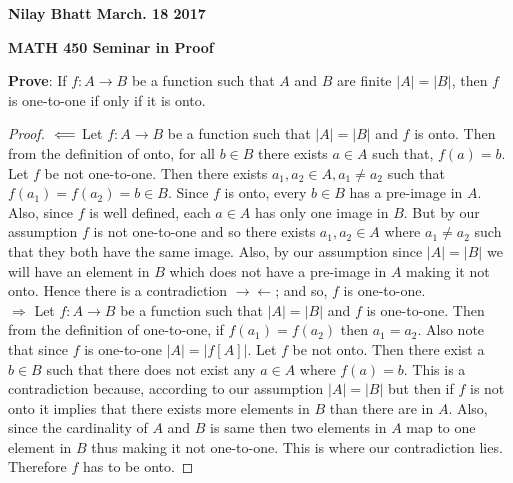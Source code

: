 \documentclass[12pt, fullpage]{article}
\begin{document}
\begin{flushleft}
\textbf{Nilay Bhatt March. 18 2017}		
\end{flushleft}
\begin{center}		
{\bf MATH 450 Seminar in Proof}
 \\
\end{center}
\textbf{Prove}: If $f: A \rightarrow B$ be a function such that $A$ and $B$ are finite $\vert A \vert = \vert B \vert$, then $f$ is one-to-one if only if it is onto.

\begin{proof}
$\\ \Longleftarrow$ Let $f: A \rightarrow B$ be a function such that $\vert A \vert = \vert B \vert$ and $f$ is onto. Then from the definition of onto, for all  $b \in B$ there exists $ a \in A$ such that, $f(a) = b$. Let $f$ be not one-to-one. Then there exists $a_1,a_2 \in A, a_1 \neq a_2$ such that $f(a_1) = f(a_2) = b \in B$. Since $f$ is onto, every $b \in B$ has a pre-image in $A$. Also, since $f$ is well defined, each $a \in A$ has only one image in $B$. But by our assumption $f$ is not one-to-one and so there exists $a_1, a_2 \in A$ where $a_1 \neq a_2$ such that they both have the same image. Also, by our assumption since $\vert A \vert = \vert B \vert$ we will have an element in $B$ which does not have a pre-image in $A$ making it not onto. Hence there is a contradiction $\rightarrow\leftarrow$; and so, $f$ is one-to-one.\\


$\Longrightarrow$  Let $f: A \rightarrow B$ be a function such that $\vert A \vert = \vert B \vert$ and $f$ is one-to-one. Then from the definition of one-to-one, if $f(a_1) = f(a_2)$ then $a_1 = a_2$. Also note that since $f$ is one-to-one $|A| =\left|f[A]\right|$. Let $f$ be not onto. Then there exist a $b \in B$ such that there does not exist any $a \in A$ where $f(a) = b$. This is a contradiction because, according to our assumption $ |A| = |B| $ but then if $f$ is not onto it implies that there exists more elements in $B$ than there are in $A$. Also, since the cardinality of $A$ and $B$ is same then two elements in $A$ map to one element in $B$ thus making it not one-to-one. This is where our contradiction lies. Therefore $f$ has to be onto.
\end{proof}
\end{document}
